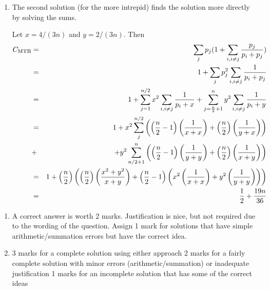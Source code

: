 \begin{solution}
\begin{enumerate}
\begin{enumerate}
	\item The second solution (for the more intrepid) finds the solution more directly
	by solving the sums.

	 Let $x=4/(3n)$ and $y=2/(3n)$. Then
	 \begin{eqnarray*}
	 C_{\hbox{\scriptsize MTB}} &= & 
	  \sum_j p_j(1+ \sum_{i,i\neq j} \frac{p_j}{p_i+p_j})\\
	  & = & 1 + \sum_j p_j^2 \sum_{i,i\neq j} \frac{1}{p_i+p_j}\\
	  & = & 1 + \sum_{j=1}^{n/2}x^2 \sum_{i,i\neq j} \frac{1}{p_i+x} + \sum_{j=\frac{n}{2} + 1}^{n}y^2 \sum_{i,i\neq j} \frac{1}{p_i+y} \\
	  & = & 1 + x^2 \sum_{j}^{n/2} \left ( \left (\frac{n}{2} - 1\right)
    \left (\frac{1}{x+x}\right) + \left(\frac{n}{2}\right )
   \left (\frac{1}{y+x}\right ) \right ) \\   
	  & + &   + y^2 \sum_{n/2 + 1}^{n}  \left ( \left (\frac{n}{2} - 1
       \right ) \left (\frac{1}{y+y}\right ) + \left (\frac{n}{2}\right )
    \left (\frac{1}{x+y} \right ) \right ) \\
	  & = & 1 + \left (\frac{n}{2} \right )
	 \left (
	 \left (\frac{n}{2} \right)
	 \left (\frac{x^2+y^2}{x+y}\right ) +
	 \left (\frac{n}{2} -1\right ) \left (x^2\left( \frac{1}{x+x} \right ) 
	 + y^2\left(\frac{1}{y+y}\right) \right )
	 \right ) \\
	  & = & \frac{1}{2} + \frac{19n}{36}
	 \end{eqnarray*}
     \end{enumerate}
  \end{enumerate}
\end{solution}

\begin{INUTILE}
  \begin{markingScheme}
    \begin{enumerate}

    \item A correct answer is worth 2 marks. Justification is nice,
      but not required due to the wording of the question.  Assign 1
      mark for solutions that have simple arithmetic/summation errors
      but have the correct idea.

    \item 3 marks for a complete solution using either approach 2
      marks for a fairly complete solution with minor errors
      (arithmetic/summation) or inadequate justification 1 marks for
      an incomplete solution that has some of the correct ideas

    \end{enumerate}
\end{markingScheme}
\end{INUTILE}
